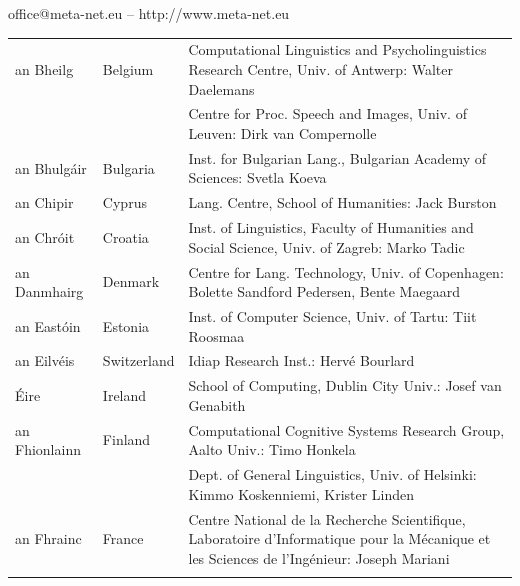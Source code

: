 \documentclass[]{../../metanetpaper}
\begin{document}
\vfill
\centerline{office@meta-net.eu -- http://www.meta-net.eu}

\cleardoublepage

\appendix
{}



  
\cleardoublepage

\label{metanetmembers}

\small
\begin{longtable}{llp{105mm}}
  an Bheilg & \textcolor{grey1}{Belgium} & Computational Linguistics and Psycholinguistics Research Centre, Univ. of Antwerp: Walter Daelemans\\ \addlinespace
  & & Centre for Proc. Speech and Images, Univ. of Leuven: Dirk van Compernolle \\ \addlinespace
  an Bhulgáir & \textcolor{grey1}{Bulgaria} & Inst. for Bulgarian Lang., Bulgarian Academy of Sciences: Svetla Koeva \\ \addlinespace
  an Chipir & \textcolor{grey1}{Cyprus} & Lang. Centre, School of Humanities: Jack Burston \\ \addlinespace
  an Chróit & \textcolor{grey1}{Croatia} & Inst. of Linguistics, Faculty of Humanities and Social Science, Univ. of Zagreb: Marko Tadic \\ \addlinespace
  an Danmhairg &  \textcolor{grey1}{Denmark} & Centre for Lang. Technology, Univ. of Copenhagen: Bolette Sandford Pedersen, Bente Maegaard\\ \addlinespace
  an Eastóin & \textcolor{grey1}{Estonia} & Inst. of Computer Science, Univ. of Tartu: Tiit Roosmaa\\ \addlinespace
  an Eilvéis & \textcolor{grey1}{Switzerland} & Idiap Research Inst.: Hervé Bourlard \\ \addlinespace 
  Éire & \textcolor{grey1}{Ireland} & School of Computing, Dublin City Univ.: Josef van Genabith\\ \addlinespace
  an Fhionlainn  & \textcolor{grey1}{Finland} & Computational Cognitive Systems Research Group, Aalto Univ.: Timo Honkela\\ \addlinespace
  & & Dept. of General Linguistics, Univ. of Helsinki: Kimmo Koskenniemi, Krister Linden \\ \addlinespace
  an Fhrainc & \textcolor{grey1}{France} & Centre National de la Recherche Scientifique, Laboratoire d'Informatique pour la Mécanique et les Sciences de l’Ingénieur: Joseph Mariani \\ \addlinespace

\end{longtable}
\end{document}
